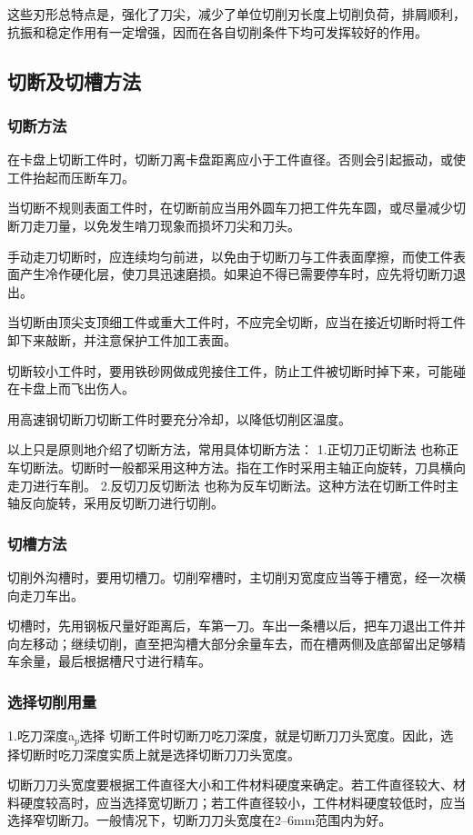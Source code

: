 \documentclass{ctexbook}
\begin{document}
这些刃形总特点是，强化了刀尖，减少了单位切削刃长度上切削负荷，排屑顺利，抗振和稳定作用有一定增强，因而在各自切削条件下均可发挥较好的作用。
\subsection{切断及切槽方法}
\subsubsection{切断方法}
在卡盘上切断工件时，切断刀离卡盘距离应小于工件直径。否则会引起振动，或使工件抬起而压断车刀。

当切断不规则表面工件时，在切断前应当用外圆车刀把工件先车圆，或尽量减少切断刀走刀量，以免发生啃刀现象而损坏刀尖和刀头。

手动走刀切断时，应连续均匀前进，以免由于切断刀与工件表面摩擦，而使工件表面产生冷作硬化层，使刀具迅速磨损。如果迫不得已需要停车时，应先将切断刀退出。

当切断由顶尖支顶细工件或重大工件时，不应完全切断，应当在接近切断时将工件卸下来敲断，并注意保护工件加工表面。

切断较小工件时，要用铁砂网做成兜接住工件，防止工件被切断时掉下来，可能碰在卡盘上而飞出伤人。

用高速钢切断刀切断工件时要充分冷却，以降低切削区温度。

以上只是原则地介绍了切断方法，常用具体切断方法：
1.正切刀正切断法 也称正车切断法。切断时一般都采用这种方法。指在工作时采用主轴正向旋转，刀具横向走刀进行车削。
2.反切刀反切断法 也称为反车切断法。这种方法在切断工件时主轴反向旋转，采用反切断刀进行切削。
\subsubsection{切槽方法}
切削外沟槽时，要用切槽刀。切削窄槽时，主切削刃宽度应当等于槽宽，经一次横向走刀车出。

切槽时，先用钢板尺量好距离后，车第一刀。车出一条槽以后，把车刀退出工件并向左移动；继续切削，直至把沟槽大部分余量车去，而在槽两侧及底部留出足够精车余量，最后根据槽尺寸进行精车。
\subsubsection{选择切削用量}
1.吃刀深度a$_p$选择 切断工件时切断刀吃刀深度，就是切断刀刀头宽度。因此，选择切断时吃刀深度实质上就是选择切断刀刀头宽度。

切断刀刀头宽度要根据工件直径大小和工件材料硬度来确定。若工件直径较大、材料硬度较高时，应当选择宽切断刀；若工件直径较小，工件材料硬度较低时，应当选择窄切断刀。一般情况下，切断刀刀头宽度在2--6mm范围内为好。
\end{document}
